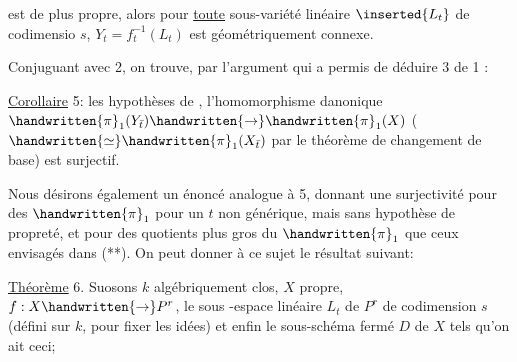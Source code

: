 est de plus propre, alors pour \uline{toute} sous-variété linéaire $\inserted{L_t}$ de codimensio
$s$, $Y_t=f_t^{-1}(L_t)$ est géométriquement connexe.

Conjuguant avec 2, on trouve, par l'argument qui a permis de
déduire 3 de 1 :

\uline{Corollaire} 5:  les hypothèses de ,  l'homomorphisme danonique
$\handwritten{\pi}_1(Y_{\bar t})\handwritten{\rightarrow}\handwritten{\pi}_1(X)$ ($\handwritten{\simeq}\handwritten{\pi}_1(X_{\bar t})$ par le théorème de changement de base) est
surjectif.

Nous désirons également un énoncé analogue à 5, donnant une surjectivité pour des $\handwritten{\pi}_1$ pour un $t$ non générique, mais sans hypothèse de propreté, et pour des quotients plus gros du $\handwritten{\pi}_1$ que ceux envisagés dans (**).
On peut donner à ce sujet le résultat suivant:

\uline{Théorème} 6. Suosons $k$ algébriquement clos,  $X$ propre, $f:X\handwritten{\rightarrow}P^r$, 
le sous -espace linéaire $L_t$ de $P^r$ de codimension $s$ (défini sur $k$, pour
fixer les idées)  et enfin le sous-schéma fermé $D$ de $X$
tels qu'on ait ceci; 

